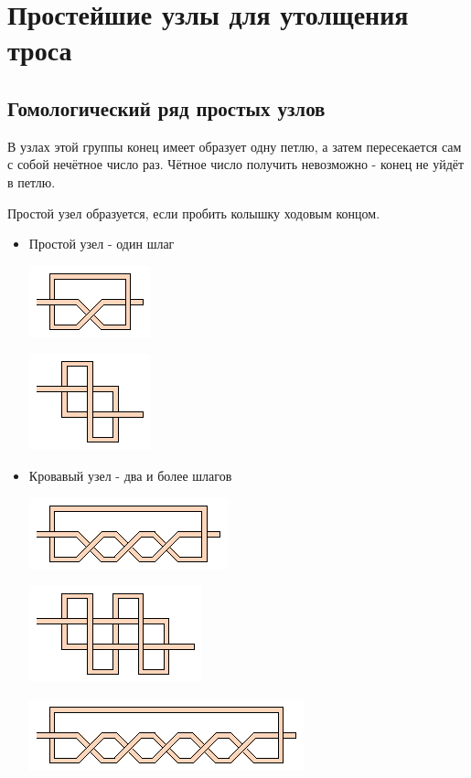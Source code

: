 \section{Простейшие узлы для утолщения троса}

\subsection{Гомологический ряд простых узлов}
В узлах этой группы конец имеет образует одну петлю, а затем пересекается сам с собой нечётное число раз.
Чётное число получить невозможно - конец не уйдёт в петлю.

\graphicspath{{\currentpath}}

Простой узел образуется, если пробить колышку ходовым концом.
\begin{itemize}
\item Простой узел - один шлаг 

\includegraphics[scale=2]{images/simple.eps}

\includegraphics[scale=2]{images/simple-v2.eps}

\item Кровавый узел - два и более шлагов 

\includegraphics[scale=2]{images/blood-1.eps}

\includegraphics[scale=2]{images/blood-1-v2.eps}

\includegraphics[scale=2]{images/blood-2.eps}

\end{itemize}

